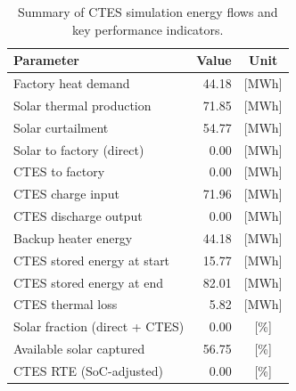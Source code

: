 \renewcommand{\arraystretch}{1.2}
\begin{table}[h]
\centering
\begin{tabular}{l|r c}
\hline
Parameter & Value & Unit \\
\hline
Factory heat demand & 44.18 & [MWh] \\
Solar thermal production & 71.85 & [MWh] \\
Solar curtailment & 54.77 & [MWh] \\
Solar to factory (direct) & 0.00 & [MWh] \\
CTES to factory & 0.00 & [MWh] \\
CTES charge input & 71.96 & [MWh] \\
CTES discharge output & 0.00 & [MWh] \\
Backup heater energy & 44.18 & [MWh] \\
CTES stored energy at start & 15.77 & [MWh] \\
CTES stored energy at end & 82.01 & [MWh] \\
CTES thermal loss & 5.82 & [MWh] \\
\hline
Solar fraction (direct + CTES) & 0.00 & [\%] \\
Available solar captured & 56.75 & [\%] \\
CTES RTE (SoC-adjusted) & 0.00 & [\%] \\
\hline
\end{tabular}
\caption{Summary of CTES simulation energy flows and key performance indicators.}
\label{tab:ctes-simulation-summary}
\end{table}
